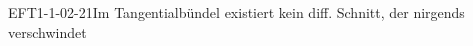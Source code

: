 
\begin{EXA}{EFT1-1-02-21}{Im Tangentialbündel existiert kein diff. Schnitt, der nirgends verschwindet}
\end{EXA}
